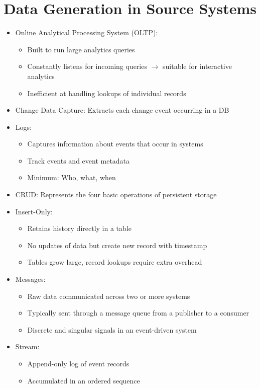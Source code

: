 \documentclass[11pt]{scrartcl}
\begin{document}
\section*{Data Generation in Source Systems}
\begin{itemize}
	\item Online Analytical Processing System (OLTP):
	\begin{itemize}
		\item Built to run large analytics queries
		\item Constantly listens for incoming queries $\to$ suitable for interactive analytics
		\item Inefficient at handling lookups of individual records
	\end{itemize}
	\item Change Data Capture: Extracts each change event occurring in a DB
	\item Logs: 
	\begin{itemize}
		\item Captures information about events that occur in systems
		\item Track events and event metadata
		\item Minimum: Who, what, when
	\end{itemize}
	\item CRUD: Represents the four basic operations of persistent storage
	\item Insert-Only: 
	\begin{itemize}
		\item Retains history directly in a table
		\item No updates of data but create new record with timestamp
		\item Tables grow large, record lookups require extra overhead
	\end{itemize}
	\item Messages: 
	\begin{itemize}
		\item Raw data communicated across two or more systems
		\item Typically sent through a message queue from a publisher to a consumer
		\item Discrete and singular signals in an event-driven system
	\end{itemize}
	\item Stream:
	\begin{itemize}
		\item Append-only log of event records
		\item Accumulated in an ordered sequence

\end{itemize}
\end{itemize}
\end{document}
